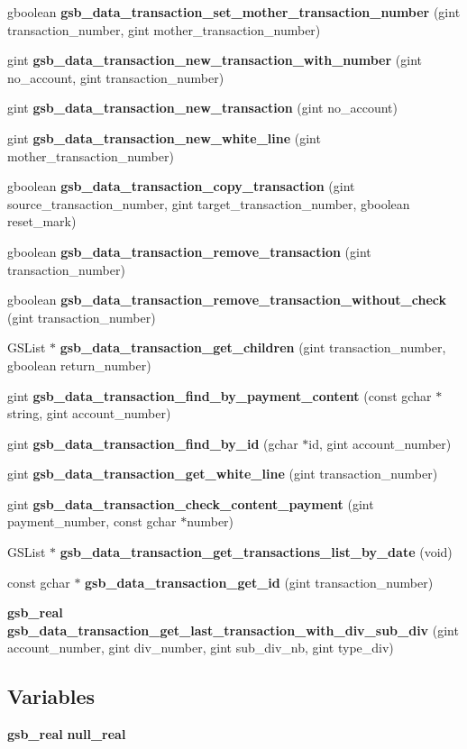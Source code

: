 \begin{DoxyCompactItemize}
\item 
gboolean {\bf gsb\_\-data\_\-transaction\_\-set\_\-mother\_\-transaction\_\-number} (gint transaction\_\-number, gint mother\_\-transaction\_\-number)
\item 
gint {\bf gsb\_\-data\_\-transaction\_\-new\_\-transaction\_\-with\_\-number} (gint no\_\-account, gint transaction\_\-number)
\item 
gint {\bf gsb\_\-data\_\-transaction\_\-new\_\-transaction} (gint no\_\-account)
\item 
gint {\bf gsb\_\-data\_\-transaction\_\-new\_\-white\_\-line} (gint mother\_\-transaction\_\-number)
\item 
gboolean {\bf gsb\_\-data\_\-transaction\_\-copy\_\-transaction} (gint source\_\-transaction\_\-number, gint target\_\-transaction\_\-number, gboolean reset\_\-mark)
\item 
gboolean {\bf gsb\_\-data\_\-transaction\_\-remove\_\-transaction} (gint transaction\_\-number)
\item 
gboolean {\bf gsb\_\-data\_\-transaction\_\-remove\_\-transaction\_\-without\_\-check} (gint transaction\_\-number)
\item 
GSList $\ast$ {\bf gsb\_\-data\_\-transaction\_\-get\_\-children} (gint transaction\_\-number, gboolean return\_\-number)
\item 
gint {\bf gsb\_\-data\_\-transaction\_\-find\_\-by\_\-payment\_\-content} (const gchar $\ast$string, gint account\_\-number)
\item 
gint {\bf gsb\_\-data\_\-transaction\_\-find\_\-by\_\-id} (gchar $\ast$id, gint account\_\-number)
\item 
gint {\bf gsb\_\-data\_\-transaction\_\-get\_\-white\_\-line} (gint transaction\_\-number)
\item 
gint {\bf gsb\_\-data\_\-transaction\_\-check\_\-content\_\-payment} (gint payment\_\-number, const gchar $\ast$number)
\item 
GSList $\ast$ {\bf gsb\_\-data\_\-transaction\_\-get\_\-transactions\_\-list\_\-by\_\-date} (void)
\item 
const gchar $\ast$ {\bf gsb\_\-data\_\-transaction\_\-get\_\-id} (gint transaction\_\-number)
\item 
{\bf gsb\_\-real} {\bf gsb\_\-data\_\-transaction\_\-get\_\-last\_\-transaction\_\-with\_\-div\_\-sub\_\-div} (gint account\_\-number, gint div\_\-number, gint sub\_\-div\_\-nb, gint type\_\-div)
\end{DoxyCompactItemize}
\subsection*{Variables}
\begin{DoxyCompactItemize}
\item 
{\bf gsb\_\-real} {\bf null\_\-real}
\end{DoxyCompactItemize}


